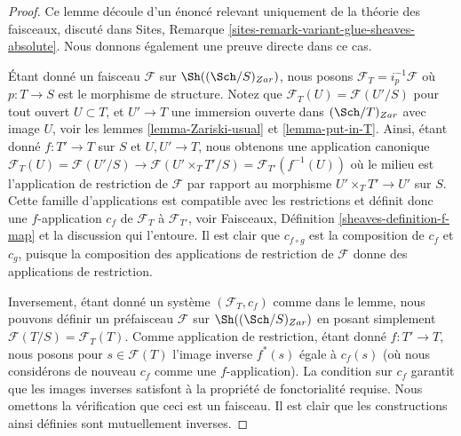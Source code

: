 \begin{proof}
Ce lemme découle d'un énoncé relevant uniquement de la théorie des faisceaux, discuté dans Sites, Remarque \ref{sites-remark-variant-glue-sheaves-absolute}. Nous donnons également une preuve directe dans ce cas.

\medskip\noindent
Étant donné un faisceau $\mathcal{F}$ sur $\Sh((\Sch/S)_{Zar})$, nous posons $\mathcal{F}_T = i_p^{-1}\mathcal{F}$ où $p : T \to S$ est le morphisme de structure. Notez que $\mathcal{F}_T(U) = \mathcal{F}(U'/S)$ pour tout ouvert $U \subset T$, et $U' \to T$ une immersion ouverte dans $(\Sch/T)_{Zar}$ avec image $U$, voir les lemmes \ref{lemma-Zariski-usual} et \ref{lemma-put-in-T}. Ainsi, étant donné $f : T' \to T$ sur $S$ et $U, U' \to T$, nous obtenons une application canonique $\mathcal{F}_T(U) = \mathcal{F}(U'/S) \to \mathcal{F}(U'\times_T T'/S) = \mathcal{F}_{T'}(f^{-1}(U))$ où le milieu est l'application de restriction de $\mathcal{F}$ par rapport au morphisme $U' \times_T T' \to U'$ sur $S$. Cette famille d'applications est compatible avec les restrictions et définit donc une $f$-application $c_f$ de $\mathcal{F}_T$ à $\mathcal{F}_{T'}$, voir Faisceaux, Définition \ref{sheaves-definition-f-map} et la discussion qui l'entoure. Il est clair que $c_{f \circ g}$ est la composition de $c_f$ et $c_g$, puisque la composition des applications de restriction de $\mathcal{F}$ donne des applications de restriction.

\medskip\noindent
Inversement, étant donné un système $(\mathcal{F}_T, c_f)$ comme dans le lemme, nous pouvons définir un préfaisceau $\mathcal{F}$ sur $\Sh((\Sch/S)_{Zar})$ en posant simplement $\mathcal{F}(T/S) = \mathcal{F}_T(T)$. Comme application de restriction, étant donné $f : T' \to T$, nous posons pour $s \in \mathcal{F}(T)$ l'image inverse $f^*(s)$ égale à $c_f(s)$ (où nous considérons de nouveau $c_f$ comme une $f$-application). La condition sur $c_f$ garantit que les images inverses satisfont à la propriété de fonctorialité requise. Nous omettons la vérification que ceci est un faisceau. Il est clair que les constructions ainsi définies sont mutuellement inverses.
\end{proof}























